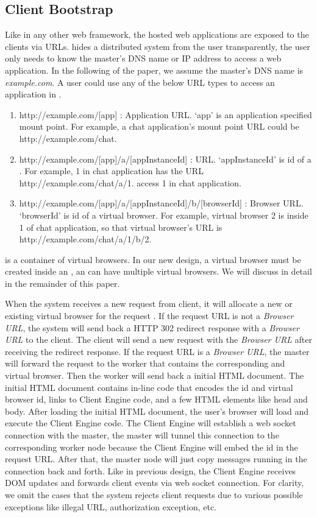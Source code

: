 \subsection{Client Bootstrap}
Like in any other web framework, 
the hosted web applications are exposed to the clients via URLs.
\cb{} hides a distributed system from the user transparently,
the user only needs to know the master's DNS name or IP address to 
access a web application.
In the following of the paper, 
we assume the master's DNS name is \emph{example.com}.
A user could use any of the below URL types to access an application in \cb{}.
\begin{enumerate}
\item \label{itm:appurl} http://example.com/[app] : Application URL.
`app' is an application specified mount point. 
For example, a chat application's mount point URL could be http://example.com/chat.
\item \label{itm:appinsurl} http://example.com/[app]/a/[appInstanceId] : \appins{} URL.
`appInstanceId' is id of a \appins{}. For example,
\appins{} 1 in chat application has the URL http://example.com/chat/a/1.
access \appins{} 1 in chat application.
\item \label{itm:vburl} http://example.com/[app]/a/[appInstanceId]/b/[browserId] : Browser URL.
`browserId' is id of a virtual browser. For example, virtual browser 2 is inside \appins{} 1 of
chat application, so that virtual browser's URL is http://example.com/chat/a/1/b/2.
\end{enumerate}
\appins{} is a container of virtual browsers.
In our new design,
a virtual browser must be created inside an \appins{},
an \appins{} can have multiple virtual browsers.
We will discuss \appins{} in detail in the remainder of this paper.

When the system receives a new request from client,
it will allocate a new or existing virtual browser for the request .
If the request URL is not a \emph{Browser URL}, 
the system will send back a HTTP 302 redirect response 
with a \emph{Browser URL} to the client.
The client will send a new request with the \emph{Browser URL} 
after receiving the redirect response.
If the request URL is a \emph{Browser URL},
the master will forward the request to the worker 
that contains the corresponding \appins{} and virtual browser.
Then the worker will send back a initial HTML document.
The initial HTML document contains in-line \js{} code that 
encodes the \appins{} id and virtual browser id,
links to Client Engine code,
and a few HTML elements like head and body.
After loading the initial HTML document, 
the user's browser will load and execute the Client Engine code.
The Client Engine will establish a web socket connection with the master,
the master will tunnel this connection to the corresponding worker node
because the Client Engine will embed the \appins{} id in the request URL.
After that, the master node will just copy messages running in the 
connection back and forth.
Like in previous design, 
the Client Engine receives DOM updates and forwards client events via
web socket connection.
For clarity, 
we omit the cases that the system rejects client requests
due to various possible exceptions like  illegal URL,
authorization exception, etc.

